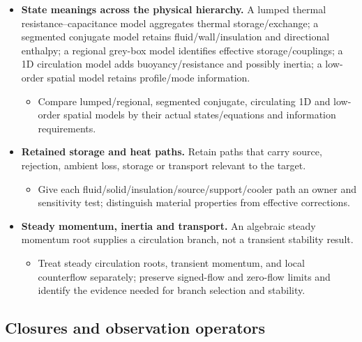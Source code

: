 \begin{itemize}[leftmargin=*]
\item {}\textbf{State meanings across the physical hierarchy.} A lumped thermal resistance--capacitance model aggregates thermal storage/\allowbreak{}exchange; a segmented conjugate model retains fluid/\allowbreak{}wall/\allowbreak{}insulation and directional enthalpy; a regional grey-box model identifies effective storage/\allowbreak{}couplings; a 1D circulation model adds buoyancy/\allowbreak{}resistance and possibly inertia; a low-order spatial model retains profile/\allowbreak{}mode information.
\begin{itemize}
\item Compare lumped/\allowbreak{}regional, segmented conjugate, circulating 1D and low-order spatial models by their actual states/\allowbreak{}equations and information requirements.
\end{itemize}
\item {}\textbf{Retained storage and heat paths.} Retain paths that carry source, rejection, ambient loss, storage or transport relevant to the target.
\begin{itemize}
\item Give each fluid/\allowbreak{}solid/\allowbreak{}insulation/\allowbreak{}source/\allowbreak{}support/\allowbreak{}cooler path an owner and sensitivity test; distinguish material properties from effective corrections.
\end{itemize}
\item {}\textbf{Steady momentum, inertia and transport.} An algebraic steady momentum root supplies a circulation branch, not a transient stability result.
\begin{itemize}
\item Treat steady circulation roots, transient momentum, and local counterflow separately; preserve signed-flow and zero-flow limits and identify the evidence needed for branch selection and stability.
\end{itemize}
\end{itemize}

\subsection{Closures and observation operators}\label{subsec:closures-and-observation-operators}

